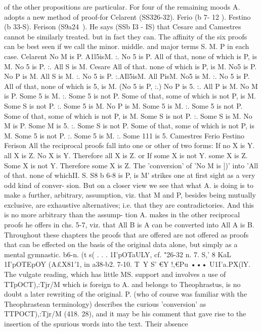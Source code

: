 {of the other propositions are particular. For four of the remaining
moods A. adopts a new method of proof-for Celarent (SS326-32).
Ferio (b 7- 12 ). Festino (b 33-S). Ferison (S9a24~). He says (SSb I3 -
IS) that Cesare and Camestres cannot be similarly treated. but in
fact they can. The affinity of the six proofs can be best seen if we
call the minor. middle. and major terms S. M. P in each case.
Celarent
No M is P.
A1l5isM.
:. No 5 is P.
All of that, none of which is P, is M.
No 5 is P.
:. All S is M.
Cesare
All of that. none of which is P, is M.
No5 is P.
No P is M.
All S is M.
:. No 5 is P. :.AIl5isM.
All PisM.
No5 is M.
:. No 5 is P. All of that, none of which is 5, is M.
(No 5 is P, :.) No P is 5.
:. All P is M.
No M is P.
Some 5 is M.
:. Some 5 is not P. Some of that, some of which is not P, is M.
Some S is not P.
:. Some 5 is M.
No P is M.
Some 5 is M.
:. Some 5 is not P. Some of that, some of which is not P, is M.
Some S is not P.
:. Some S is M.
No M is P.
Some M is 5.
:. Some S is not P. Some of that, some of which is not P, is M.
Some 5 is not P.
:. Some 5 is M.
:. Some 111 is 5.
Camestres
Ferio
Festino
Ferison
All the reciprocal proofs fall into one or other of two forms: If
no X is Y. all X is Z. No X is Y. Therefore all X is Z. or If some
X is not Y. some X is Z. Some X is not Y. Therefore some X is Z.
The 'conversion' of 'No M is ])' into 'All of that. none of whichII. S. S8 b 6-8
is P, is M' strikes one at first sight as a very odd kind of conver-
sion. But on a closer view we see that what A. is doing is to make
a further, arbitrary, assumption, viz. that M and P, besides being
mutually exclusive, are exhaustive alternatives; i.e. that they are
contradictories. And this is no more arbitrary than the assump-
tion A. makes in the other reciprocal proofs he offers in chs. 5-7,
viz. that All B is A can be converted into All A is B. Throughout
these chapters the proofs that are offered are not offered as proofs
that can be effected on the basis of the original data alone, but
simply as a mental gymnastic.
b6-n. (t s( . . . 1I'pOTaULY, cf. "26-32 n.
7. S,' 8 KaL 1I'pOTEpOY (A£X81'1, in a38-b2.
7-10. T~Y S' €Y !,€Pu ••• U1I'a.PX(lY. The vulgate reading, which
has little MS. support and involves a use of TTpOCT),:Tjr/M which is
foreign to A. and belongs to Theophrastus, is no doubt a later
rewriting of the original. P. (who of course was familiar with the
Theophrastean terminology) describes the curious 'conversion' as
TTPOCT),:Tjr/M (418. 28), and it may be his comment that gave rise to
the insertion of the spurious words into the text. Their absence
}

